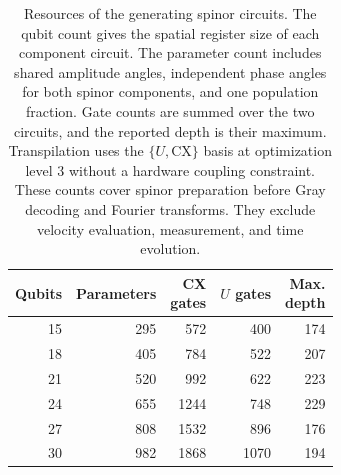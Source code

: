 \begin{table}[t]
\centering
\caption{Resources of the generating spinor circuits.
The qubit count gives the spatial register size of each component circuit.
The parameter count includes shared amplitude angles, independent phase angles for both spinor components, and one population fraction.
Gate counts are summed over the two circuits, and the reported depth is their maximum.
Transpilation uses the $\{U,\mathrm{CX}\}$ basis at optimization level 3 without a hardware coupling constraint.
These counts cover spinor preparation before Gray decoding and Fourier transforms.
They exclude velocity evaluation, measurement, and time evolution.}
\label{tab:spinor_circuit_resources}
\begin{tabular}{rrrrr}
\hline\hline
Qubits & Parameters & \shortstack{CX\\gates} & \shortstack{$U$\\gates} & \shortstack{Max.\\depth} \\
\hline
15 & 295 & 572 & 400 & 174 \\
18 & 405 & 784 & 522 & 207 \\
21 & 520 & 992 & 622 & 223 \\
24 & 655 & 1244 & 748 & 229 \\
27 & 808 & 1532 & 896 & 176 \\
30 & 982 & 1868 & 1070 & 194 \\
\hline\hline
\end{tabular}
\end{table}
